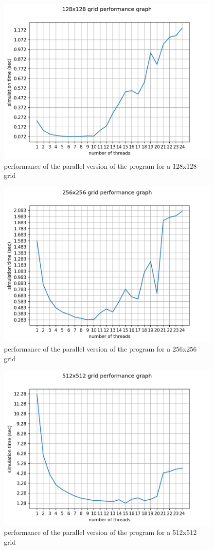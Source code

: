 \documentclass[unicode,11pt,a4paper,oneside,numbers=endperiod,openany]{scrartcl}
\begin{document}
\begin{figure}[H]
\centering
\includegraphics[width=0.8\linewidth]{128manualplot.png}
\caption{performance of the parallel version of the program for a 128x128 grid}
\end{figure}
\begin{figure}[H]
\centering
\includegraphics[width=0.8\linewidth]{256manualplot.png}
\caption{performance of the parallel version of the program for a 256x256 grid}
\end{figure}
\begin{figure}[H]
\centering
\includegraphics[width=0.8\linewidth]{512manualplot.png}
\caption{performance of the parallel version of the program for a 512x512 grid}
\end{figure}
\end{document}
